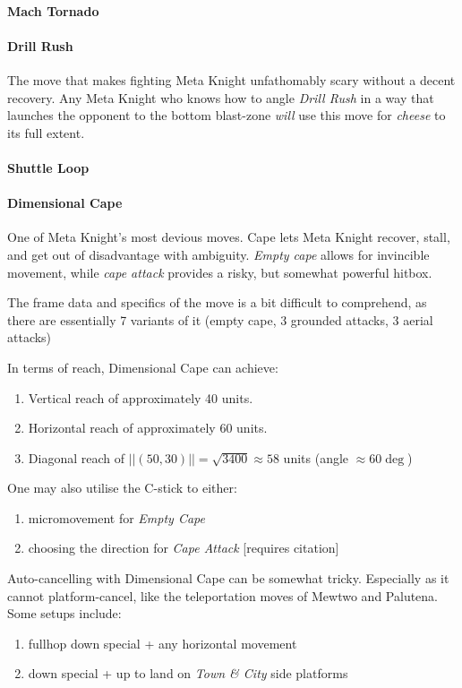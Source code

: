 \paragraph[Neutral Special]{Mach Tornado}
\paragraph[Side Special]{Drill Rush}
The move that makes fighting Meta Knight unfathomably scary without a decent recovery. Any Meta Knight who knows how to angle \textit{Drill Rush} in a way that launches the opponent to the bottom blast-zone \textit{will} use this move for \textit{cheese} to its full extent.
\paragraph[Up Special]{Shuttle Loop}
\paragraph[Down Special]{Dimensional Cape}
One of Meta Knight's most devious moves. Cape lets Meta Knight recover, stall, and get out of disadvantage with ambiguity. \textit{Empty cape} allows for invincible movement, while \textit{cape attack} provides a risky, but somewhat powerful hitbox.

The frame data and specifics of the move is a bit difficult to comprehend, as there are essentially 7 variants of it (empty cape, 3 grounded attacks, 3 aerial attacks)

In terms of reach, Dimensional Cape can achieve:
\begin{enumerate}[label = \roman*.]
	\item Vertical reach of approximately 40 units.
	\item Horizontal reach of approximately 60 units.
	\item Diagonal reach of $||(50, 30)|| = \sqrt{3400} \approx 58$ units (angle $\approx 60\deg$)
\end{enumerate}
One may also utilise the C-stick to either:
\begin{enumerate}[label = \roman*.]
	\item micromovement for \textit{Empty Cape}
	\item choosing the direction for \textit{Cape Attack} [requires citation] %
\end{enumerate}

Auto-cancelling with Dimensional Cape can be somewhat tricky. Especially as it cannot platform-cancel, like the teleportation moves of Mewtwo and Palutena. 
Some setups include:
\begin{enumerate}[label = \roman*.]
	\item fullhop down special + any horizontal movement
	\item down special + up to land on \textit{Town \& City} side platforms
\end{enumerate}

